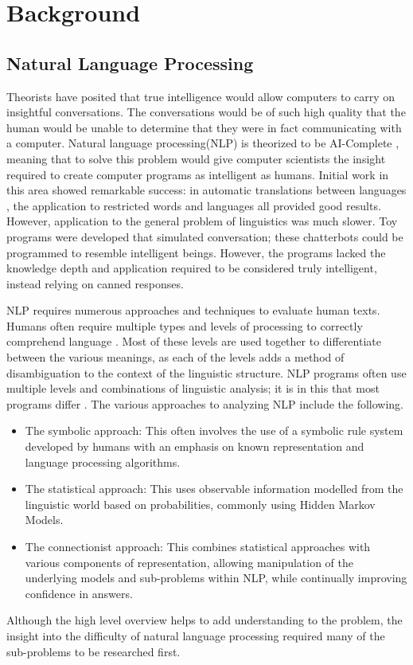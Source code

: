 \chapter{Background} 

\section{Natural Language Processing}

Theorists have posited that true intelligence would allow computers to carry 
on insightful conversations. The conversations would be of
such high quality that the human would be unable to determine that they were in
fact communicating with a computer\cite{TURING_TEST}.  Natural language
processing(NLP) is theorized to be AI-Complete \cite{AICOMPLETE}, meaning that
to solve this problem would give computer scientists the insight required to
create computer programs as intelligent as humans.  Initial work in this area
showed remarkable success: in automatic translations between languages
\cite{EN_RUS}, the application to restricted words and
languages\cite{AI_MODERN} all provided good results.  However, application to
the general problem of linguistics was much slower.  Toy programs were developed
that simulated conversation; these chatterbots could be programmed to resemble
intelligent beings.  However, the programs lacked the knowledge depth and
application required to be considered truly intelligent, instead relying on
canned responses.   

NLP requires numerous approaches and techniques to
evaluate human texts. Humans often require multiple types and levels of
processing to correctly comprehend language \cite{NLPENCY}. Most of these levels
are used together to differentiate between the various meanings, as each of the
levels adds a method of disambiguation to the context of the linguistic
structure.  NLP programs often use multiple levels and combinations of
linguistic analysis; it is in this that most programs differ \cite{NLPENCY}.
The various approaches to analyzing NLP include the following. \begin{itemize}
\item The symbolic approach: This often involves the use of a symbolic rule
system developed by humans with an emphasis on known representation and language
processing algorithms.     \item The statistical approach: This uses observable
information modelled from the linguistic world based on probabilities, commonly
using Hidden Markov Models.     \item The connectionist approach: This combines
statistical approaches with various components of representation, allowing
manipulation of the underlying models and sub-problems within NLP, while
continually improving confidence in answers. \end{itemize} Although the high
level overview helps to add understanding to the problem, the insight into the
difficulty of natural language processing required many of the sub-problems to
be researched first.

